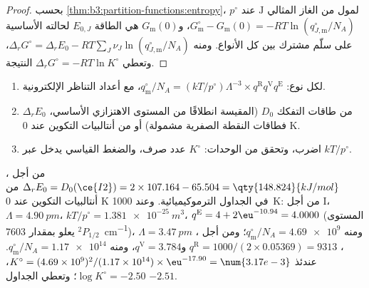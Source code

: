\begin{proof}
بحسب \cref{thm:b3:partition-functions:entropy}، لمول من الغاز المثالي $\mathrm J$ عند $p^\circ$
$G^\circ_{\mathrm m} - G_{\mathrm m}(0) = -RT\ln(q^\circ_{J,\mathrm m}/N_A)$، و$G_{\mathrm m}(0)$ هي الطاقة $E_{0,J}$
لحالته الأساسية على سلّم مشترك بين كل الأنواع. ومنه $\Delta_rG^\circ =
\Delta_rE_0 - RT\sum_J\nu_J\ln(q^\circ_{J,\mathrm m}/N_A)$، وتعطي $\Delta_rG^\circ = -RT\ln K^\circ$
النتيجة.
\end{proof}

\begin{method}\label{met:b3:statistical-thermo-applied:k-stat}
\begin{enumerate}
  \item لكل نوع: $q^\circ_{\mathrm m}/N_A = (kT/p^\circ)\Lambda^{-3}\times q^{\mathrm R}q^{\mathrm V}q^{\mathrm E}$، مع
        أعداد التناظر  الإلكترونية.
  \item $\Delta_rE_0$ من طاقات التفكك $D_0$ (المقيسة انطلاقًا من المستوى
        الاهتزازي الأساسي، فطاقات النقطة الصفرية مشمولة) أو من
        أنتالبيات التكوين عند 0 K.
  \item اضرب، وتحقق من الوحدات: $K^\circ$ عدد صرف، والضغط
        القياسي يدخل عبر $kT/p^\circ$.
\end{enumerate}
\end{method}

\begin{example}\label{ex:b3:statistical-thermo-applied:iodine}
من أجل ، $\Delta_rE_0 = D_0(\ce{I2}) = 2 \times 107.164 - 65.504 = \qty{148.824}{kJ/mol}$
من أنتالبيات التكوين عند 0 K في الجداول الترموكيميائية. وعند
\qty{1000}{K}: من أجل I، $\Lambda = \qty{4.90}{pm}$، $kT/p^\circ = \qty{1.381e-25}{m^3}$، $q^{\mathrm E} = 4 +
2\eu^{-10.94} = 4.0000$ (المستوى ${}^2P_{1/2}$ يعلو بمقدار \qty{7603}{cm^{-1}})، ومنه $q^\circ_{\mathrm m}/N_A = \num{4.69e9}$؛
ومن أجل ، $\Lambda = \qty{3.47}{pm}$، $q^{\mathrm R} = 1000/(2 \times 0.05369) = 9313$ و$q^{\mathrm V} = 3.784$، ومنه
$q^\circ_{\mathrm m}/N_A = \num{1.17e14}$. عندئذ $K^\circ = (4.69\times10^9)^2/(1.17\times10^{14}) \times \eu^{-17.90} =
\num{3.17e-3}$، $\log K^\circ = -2.50$؛ وتعطي الجداول $-2.51$.
\end{example}

